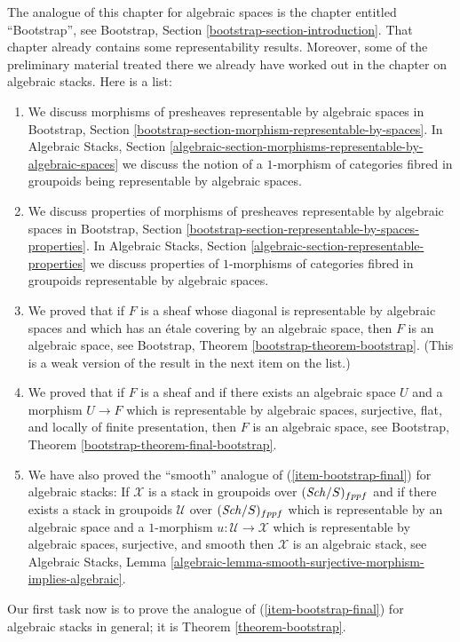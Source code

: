 \noindent
The analogue of this chapter for algebraic spaces is the chapter entitled
``Bootstrap'', see
Bootstrap, Section \ref{bootstrap-section-introduction}.
That chapter already contains some representability results.
Moreover, some of the preliminary material treated there we already
have worked out in the chapter on algebraic stacks.
Here is a list:
\begin{enumerate}
\item We discuss morphisms of presheaves representable by algebraic spaces in
Bootstrap, Section
\ref{bootstrap-section-morphism-representable-by-spaces}.
In
Algebraic Stacks, Section
\ref{algebraic-section-morphisms-representable-by-algebraic-spaces}
we discuss the notion of a $1$-morphism of categories fibred in groupoids
being representable by algebraic spaces.
\item We discuss properties of morphisms of presheaves representable by
algebraic spaces in
Bootstrap, Section
\ref{bootstrap-section-representable-by-spaces-properties}.
In
Algebraic Stacks, Section
\ref{algebraic-section-representable-properties}
we discuss properties of $1$-morphisms of categories fibred in groupoids
representable by algebraic spaces.
\item We proved that if $F$ is a sheaf whose diagonal is representable
by algebraic spaces and which has an \'etale covering by an algebraic
space, then $F$ is an algebraic space, see
Bootstrap, Theorem \ref{bootstrap-theorem-bootstrap}.
(This is a weak version of the result in the next item on the list.)
\item
\label{item-bootstrap-final}
We proved that if $F$ is a sheaf and if there exists an algebraic
space $U$ and a morphism $U \to F$ which is representable by algebraic
spaces, surjective, flat, and locally of finite presentation, then
$F$ is an algebraic space, see
Bootstrap, Theorem \ref{bootstrap-theorem-final-bootstrap}.
\item We have also proved the ``smooth'' analogue of
(\ref{item-bootstrap-final}) for algebraic
stacks: If $\mathcal{X}$ is a stack in groupoids over
$(\mathit{Sch}/S)_{fppf}$ and if there exists a stack in groupoids
$\mathcal{U}$ over $(\mathit{Sch}/S)_{fppf}$ which is representable
by an algebraic space and a $1$-morphism $u : \mathcal{U} \to \mathcal{X}$
which is representable by algebraic spaces, surjective, and smooth
then $\mathcal{X}$ is an algebraic stack, see
Algebraic Stacks, Lemma
\ref{algebraic-lemma-smooth-surjective-morphism-implies-algebraic}.
\end{enumerate}
Our first task now is to prove the analogue of
(\ref{item-bootstrap-final}) for algebraic
stacks in general; it is
Theorem \ref{theorem-bootstrap}.



